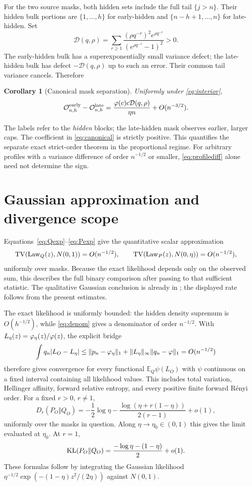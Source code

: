 \documentclass[11pt,a4paper]{article}
\newtheorem{corollary}[theorem]{Corollary}\newtheorem{proposition}[theorem]{Proposition}
\theoremstyle{remark}\newtheorem*{ednote}{Editorial note (ProveIt, 2026-10-01)}
\newcommand{\E}{\mathbb E}\newcommand{\R}{\mathbb R}\newcommand{\TV}{\operatorname{TV}}
\begin{document}
For the two source masks, both hidden sets include the full tail $\{j>n\}$. Their hidden bulk portions are $\{1,\ldots,h\}$ for early-hidden and $\{n-h+1,\ldots,n\}$ for late-hidden. Set
\begin{equation}\label{eq:Dphase}
 \mathcal D(q,\rho)=\sum_{r\ge1}
       \frac{(\rho q^{-r})^2e^{\rho q^{-r}}}
            {(e^{\rho q^{-r}}-1)^2}>0.
\end{equation}
The early-hidden bulk has a superexponentially small variance defect; the late-hidden bulk has defect $-\mathcal D(q,\rho)$ up to such an error. Their common tail variance cancels. Therefore
\begin{corollary}[Canonical mask separation]\label{cor:canonical}
Uniformly under \eqref{eq:interior},
\begin{equation}\label{eq:canonical}
 \mathcal O^{\rm early}_{n,h}-\mathcal O^{\rm late}_{n,h}
 =\frac{\varphi(c)c\mathcal D(q,\rho)}{\eta n}+O(n^{-3/2}).
\end{equation}
\end{corollary}
The labels refer to the \emph{hidden} blocks; the late-hidden mask observes earlier, larger caps. The coefficient in \eqref{eq:canonical} is strictly positive. This quantifies the separate exact strict-order theorem \cite{Strict} in the proportional regime. For arbitrary profiles with a variance difference of order $n^{-1/2}$ or smaller, \eqref{eq:profilediff} alone need not determine the sign.

\section{Gaussian approximation and divergence scope}
Equations~\eqref{eq:Qexp}--\eqref{eq:Pexp} give the quantitative scalar approximation
\[
 \TV(\Law_Q(z),N(0,1))=O(n^{-1/2}),\qquad
 \TV(\Law_P(z),N(0,\eta))=O(n^{-1/2}),
\]
uniformly over masks. Because the exact likelihood depends only on the observed sum, this describes the full binary comparison after passing to that sufficient statistic. The qualitative Gaussian conclusion is already in \cite{Repository}; the displayed rate follows from the present estimates.

The exact likelihood is uniformly bounded: the hidden density supremum is $O(h^{-1/2})$, while \eqref{eq:denom} gives a denominator of order $n^{-1/2}$. With $L_\eta(z)=\varphi_\eta(z)/\varphi(z)$, the explicit bridge
\[
 \int q_n|L_O-L_\eta|
 \le\|p_n-\varphi_\eta\|_1+\|L_\eta\|_\infty\|q_n-\varphi\|_1
 =O(n^{-1/2})
\]
therefore gives convergence for every functional $\E_Q\psi(L_O)$ with $\psi$ continuous on a fixed interval containing all likelihood values. This includes total variation, Hellinger affinity, forward relative entropy, and every positive finite forward R\'enyi order. For a fixed $r>0$, $r\ne1$,
\begin{equation}\label{eq:renyi}
 D_r(P_O\Vert Q_O)=
 -\frac12\log\eta-\frac{\log(\eta+r(1-\eta))}{2(r-1)}+o(1),
\end{equation}
uniformly over the masks in question. Along $\eta\to\eta_0\in(0,1)$ this gives the limit evaluated at $\eta_0$. At $r=1$,
\[
 \operatorname{KL}(P_O\Vert Q_O)=\frac{-\log\eta-(1-\eta)}2+o(1).
\]
These formulas follow by integrating the Gaussian likelihood
$\eta^{-1/2}\exp(-(1-\eta)z^2/(2\eta))$ against $N(0,1)$.
\end{document}
